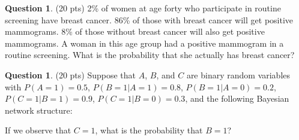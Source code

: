 \documentclass{article}
\theoremstyle{definition}
\newtheorem{question}[thm]{Question}
\begin{document}

\begin{question} (20 pts)
    2\% of women at age forty who participate in routine screening have breast cancer. 86\% of those with breast cancer will get positive mammograms. 8\% of those without breast cancer will also get positive mammograms. A woman in this age group had a positive mammogram in a routine screening. What is the probability that she actually has breast cancer?
\end{question}

\begin{question} (20 pts) Suppose that $A$, $B$, and $C$ are binary random variables with $P(A=1) = 0.5$, $P(B=1|A=1) = 0.8$, $P(B=1|A=0) = 0.2$, $P(C=1|B=1) = 0.9$, $P(C=1|B=0) = 0.3$, and the following Bayesian network structure:
    \begin{center}
    \end{center}
If we observe that $C=1$, what is the probability that $B=1$?
\end{question}
\end{document}

